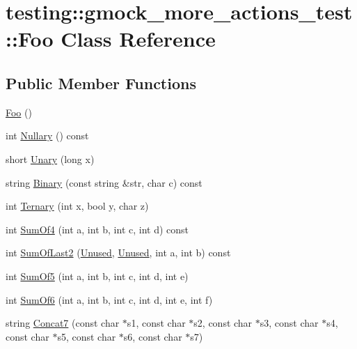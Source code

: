 \hypertarget{classtesting_1_1gmock__more__actions__test_1_1Foo}{}\section{testing\+:\+:gmock\+\_\+more\+\_\+actions\+\_\+test\+:\+:Foo Class Reference}
\label{classtesting_1_1gmock__more__actions__test_1_1Foo}
\subsection*{Public Member Functions}
\begin{DoxyCompactItemize}
\item 
\hyperlink{classtesting_1_1gmock__more__actions__test_1_1Foo_ad2603a65b94e019c75f4227787b9177e}{Foo} ()
\item 
int \hyperlink{classtesting_1_1gmock__more__actions__test_1_1Foo_ab96640ab521acae74bd620ca8ff5a809}{Nullary} () const 
\item 
short \hyperlink{classtesting_1_1gmock__more__actions__test_1_1Foo_a68d2b46d6cc7d51979b0254940af6090}{Unary} (long x)
\item 
string \hyperlink{classtesting_1_1gmock__more__actions__test_1_1Foo_acb4ce6889ca41321d6f598d0a0111905}{Binary} (const string \&str, char c) const 
\item 
int \hyperlink{classtesting_1_1gmock__more__actions__test_1_1Foo_afc5b86988210ad598fa3a2a9822297e4}{Ternary} (int x, bool y, char z)
\item 
int \hyperlink{classtesting_1_1gmock__more__actions__test_1_1Foo_aedb314b0f2baa25817b98c1b3826ff00}{Sum\+Of4} (int a, int b, int c, int d) const 
\item 
int \hyperlink{classtesting_1_1gmock__more__actions__test_1_1Foo_a1024d41fae87bf011a7a8e1b4cd5f4d3}{Sum\+Of\+Last2} (\hyperlink{namespacetesting_a603e329ec0263ebfcf16f712810bd511}{Unused}, \hyperlink{namespacetesting_a603e329ec0263ebfcf16f712810bd511}{Unused}, int a, int b) const 
\item 
int \hyperlink{classtesting_1_1gmock__more__actions__test_1_1Foo_a55fb0cdc224c450f401e0fea4f979512}{Sum\+Of5} (int a, int b, int c, int d, int e)
\item 
int \hyperlink{classtesting_1_1gmock__more__actions__test_1_1Foo_a34b5ae7cd4620331af92c637e3534bc4}{Sum\+Of6} (int a, int b, int c, int d, int e, int f)
\item 
string \hyperlink{classtesting_1_1gmock__more__actions__test_1_1Foo_a267eab73377069cdd153f351e577ec01}{Concat7} (const char $\ast$s1, const char $\ast$s2, const char $\ast$s3, const char $\ast$s4, const char $\ast$s5, const char $\ast$s6, const char $\ast$s7)

\end{DoxyCompactItemize}
